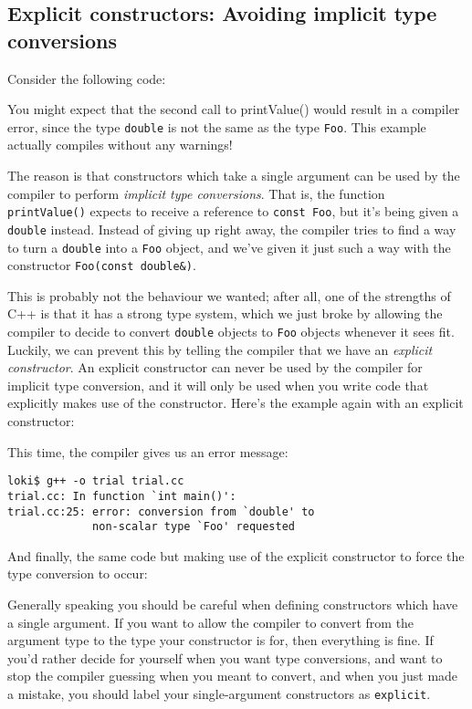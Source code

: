\documentclass[a4paper]{scrartcl}
\begin{document}


\subsection{Explicit constructors: Avoiding implicit type conversions}
Consider the following code:



You might expect that the second call to printValue() would result in a compiler error, since the type \texttt{double} is not the same as the type \texttt{Foo}. This example actually compiles without any warnings!

The reason is that constructors which take a single argument can be used by the compiler to perform \emph{implicit type conversions}. That is, the function \texttt{printValue()} expects to receive a reference to \texttt{const Foo}, but it's being given a \texttt{double} instead. Instead of giving up right away, the compiler tries to find a way to turn a \texttt{double} into a \texttt{Foo} object, and we've given it just such a way with the constructor \texttt{Foo(const double\&)}.

This is probably not the behaviour we wanted; after all, one of the strengths of C++ is that it has a strong type system, which we just broke by allowing the compiler to decide to convert \texttt{double} objects to \texttt{Foo} objects whenever it sees fit. Luckily, we can prevent this by telling the compiler that we have an \emph{explicit constructor}. An explicit constructor can never be used by the compiler for implicit type conversion, and it will only be used when you write code that explicitly makes use of the constructor. Here's the example again with an explicit constructor:



This time, the compiler gives us an error message:
\begin{verbatim}
loki$ g++ -o trial trial.cc
trial.cc: In function `int main()':
trial.cc:25: error: conversion from `double' to
             non-scalar type `Foo' requested
\end{verbatim}

And finally, the same code but making use of the explicit constructor to force the type conversion to occur:



Generally speaking you should be careful when defining constructors which have a single argument. If you want to allow the compiler to convert from the argument type to the type your constructor is for, then everything is fine. If you'd rather decide for yourself when you want type conversions, and want to stop the compiler guessing when you meant to convert, and when you just made a mistake, you should label your single-argument constructors as \texttt{explicit}.
\end{document}
